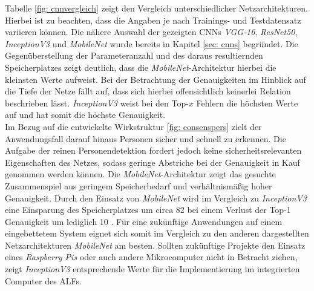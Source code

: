 		
		
			
		
		Tabelle \ref{fig: cnnvergleich} zeigt den Vergleich unterschiedlicher Netzarchitekturen. Hierbei ist zu beachten, dass die Angaben je nach Trainings- und Testdatensatz variieren können. Die nähere Auswahl der gezeigten CNNs \textit{VGG-16}, \textit{ResNet50}, \textit{InceptionV3} und \textit{MobileNet} wurde bereits in Kapitel \ref{sec: cnns} begründet. Die Gegenüberstellung der Parameteranzahl und des daraus resultiernden Speicherplatzes zeigt deutlich, dass die \textit{MobileNet}-Architektur hierbei die kleinsten Werte aufweist. Bei der Betrachtung der Genauigkeiten im Hinblick auf die Tiefe der Netze fällt auf, dass sich hierbei offensichtlich keinerlei Relation beschrieben lässt. \textit{InceptionV3} weist bei den Top-$x$ Fehlern die höchsten Werte auf und hat somit die höchste Genauigkeit.\\
		
		Im Bezug auf die entwickelte Wirkstruktur \ref{fig: consenspers} zielt der Anwendungsfall darauf hinaus Personen sicher und schnell zu erkennen. Die Aufgabe der reinen Personendetektion fordert jedoch keine sicherheitsrelevanten Eigenschaften des Netzes, sodass geringe Abstriche bei der Genauigkeit in Kauf genommen werden können. Die \textit{MobileNet}-Architektur zeigt das gesuchte Zusammenspiel aus geringem Speicherbedarf und verhältnismäßig hoher Genauigkeit. Durch den Einsatz von \textit{MobileNet} wird im Vergleich zu \textit{InceptionV3} eine Einsparung des Speicherplatzes um circa 82 \percent bei einem Verlust der Top-1 Genauigkeit um lediglich 10 \percent. Für eine zukünftige Anwendungen auf einem eingebettetem System eignet sich somit im Vergleich zu den anderen dargestellten Netzarchitekturen \textit{MobileNet} am besten. Sollten zukünftige Projekte den Einsatz eines \textit{Raspberry Pis} oder auch andere Mikrocomputer nicht in Betracht ziehen, zeigt \textit{InceptionV3} entsprechende Werte für die Implementierung im integrierten Computer des ALFs.\\
		
		
		
